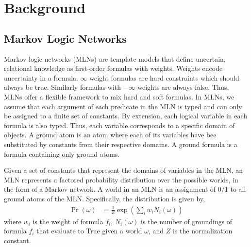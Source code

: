 \section{Background}
\subsection{Markov Logic Networks} Markov logic networks (MLNs) are template models that define uncertain, relational knowledge as first-order formulas with weights. Weights encode uncertainty in a formula. $\infty$ weight formulas are hard constraints which should always be true. Similarly formulas with $-\infty$ weights are always false. Thus, MLNs offer a flexible framework to mix hard and soft formulas. In MLNs, we assume that each argument of each predicate in the MLN is typed and can only be assigned to a finite set of constants. By extension, each logical variable in each formula is also typed. Thus, each variable corresponds to a specific domain of objects. A ground atom is an atom where each of its variables have bee substituted by constants from their respective domains. A ground formula is a formula containing only ground atoms.

Given a set of constants that represent the domains of variables in the MLN, an MLN represents a factored probability distribution over the possible worlds, in the form of a Markov network. A world in an MLN is an assignment of 0/1 to all ground atoms of the MLN. Specifically, the distribution is given by,
 \begin{align} \Pr(\omega) &
= \frac{1}{Z} \exp \left ( \sum_{i} w_i N_{i}(\omega) \right ) \label{eq:mln_prob_dist}
\end{align} where $w_i$ is the weight of formula $f_i$, $N_{i}({\omega})$ is the number of groundings of formula $f_i$ that evaluate to True given a world
$\omega$, and $Z$ is the normalization constant.

